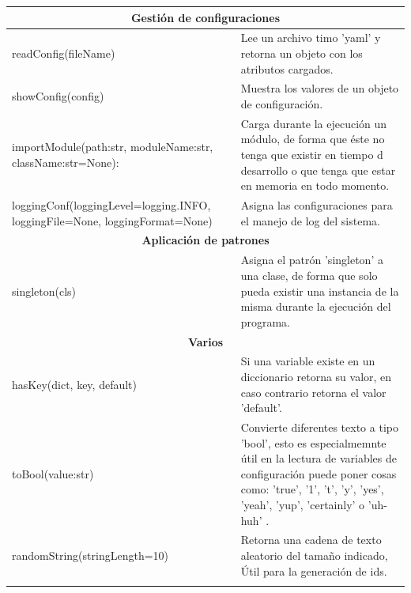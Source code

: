 \begin{longtable}[c]{ p{7cm} p{7cm} }
                    \hline\hline\hline
                    \multicolumn{2}{|c|}{\textbf{Gestión de configuraciones}}\\ 
                    \hline\hline
                    readConfig(fileName) & Lee un archivo timo 'yaml' y retorna un objeto con los atributos cargados.\\
                    \hline
                    showConfig(config) & Muestra los valores de un objeto de configuración.\\
                    \hline
                    importModule(path:str, moduleName:str, className:str=None): & Carga durante la ejecución un módulo, de forma que éste no tenga que existir en tiempo d desarrollo o que tenga que estar en memoria en todo momento.\\
                    \hline
                    loggingConf(loggingLevel=logging.INFO, loggingFile=None, loggingFormat=None) & Asigna las configuraciones para el manejo de log del sistema.\\
                    
                    \hline\hline\hline
                    \multicolumn{2}{|c|}{\textbf{Aplicación de patrones}}\\ 
                    \hline\hline
                    singleton(cls) & Asigna el patrón 'singleton'\index{singleton} a una clase, de forma que solo pueda existir una instancia de la misma durante la ejecución del programa.\\
                    
                    \hline\hline\hline
                    \multicolumn{2}{|c|}{\textbf{Varios}}\\ 
                    \hline\hline
                    hasKey(dict, key, default) & Si una variable existe en un diccionario retorna su valor, en caso contrario retorna el valor 'default'.\\
                    \hline
                    toBool(value:str) & Convierte diferentes texto a tipo 'bool', esto es especialmemnte útil en la lectura de variables de configuración puede poner cosas como: 'true', '1', 't', 'y', 'yes', 'yeah', 'yup', 'certainly' o 'uh-huh' .\\
                    \hline
                    randomString(stringLength=10) & Retorna una cadena de texto aleatorio del tamaño indicado, Útil para la generación de ids.\\
                    \hline
       
            \label{Tab:MiscMethods}
        \end{longtable}
        
